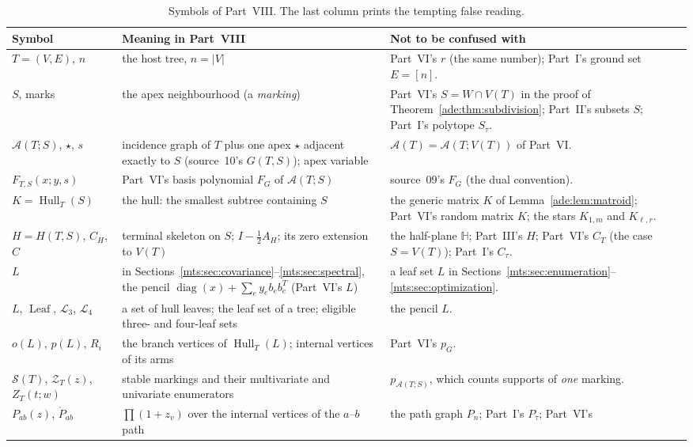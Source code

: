 \documentclass[11pt]{article}
\numberwithin{equation}{section}
\theoremstyle{definition}
\newcommand{\diag}{\operatorname{diag}}
\newcommand{\HH}{\mathbb H}
\newcommand{\calA}{\mathcal A}
\newcommand{\Hull}{\operatorname{Hull}}
\newcommand{\Leaf}{\operatorname{Leaf}}
\newcommand{\Stab}{\mathcal S}
\newcommand{\Zpoly}{\mathcal Z}
\newcommand{\pathin}[2]{\mathring P_{#1#2}}
\begin{document}
\begin{table}[tbp]
\centering\footnotesize
\caption{Symbols of Part~VIII. The last column prints the tempting false
reading.}
\label{mts:tab:notation}
\begin{tabularx}{\textwidth}{@{}>{\raggedright}p{}>{\raggedright}p{}Y@{}}
\toprule
Symbol & Meaning in Part~VIII & Not to be confused with\\
\midrule
$T=(V,E)$, $n$ & the host tree, $n=|V|$ & Part~VI's $r$ (the same number);
 Part~I's ground set $E=[n]$.\\
$S$, marks & the apex neighbourhood (a \emph{marking}) & Part~VI's
 $S=W\cap V(T)$ in the proof of Theorem~\ref{ade:thm:subdivision}; Part~II's
 subsets $S$; Part~I's polytope $S_\tau$.\\
$\calA(T;S)$, $\star$, $s$ & incidence graph of $T$ plus one apex $\star$
 adjacent exactly to $S$ (source~10's $G(T,S)$); apex variable &
 $\calA(T)=\calA(T;V(T))$ of Part~VI.\\
$F_{T,S}(x;y,s)$ & Part~VI's basis polynomial $F_G$ of $\calA(T;S)$ &
 source~09's $F_G$ (the dual convention).\\
$K=\Hull_T(S)$ & the hull: the smallest subtree containing $S$ & the
 generic matrix $K$ of Lemma~\ref{ade:lem:matroid}; Part~VI's random matrix
 $K$; the stars $K_{1,m}$ and $K_{\ell,r}$.\\
$H=H(T,S)$, $C_H$, $C$ & terminal skeleton on $S$; $I-\tfrac12A_H$; its
 zero extension to $V(T)$ & the half-plane $\HH$; Part~III's $H$; Part~VI's
 $C_T$ (the case $S=V(T)$); Part~I's $C_\tau$.\\
$L$ & in Sections~\ref{mts:sec:covariance}--\ref{mts:sec:spectral}, the
 pencil $\diag(x)+\sum_ey_eb_eb_e^T$ (Part~VI's $L$) & a leaf set $L$ in
 Sections~\ref{mts:sec:enumeration}--\ref{mts:sec:optimization}.\\
$L$, $\Leaf$, $\mathcal L_3$, $\mathcal L_4$ & a set of hull leaves; the
 leaf set of a tree; eligible three- and four-leaf sets & the pencil $L$.\\
$o(L)$, $p(L)$, $R_i$ & the branch vertices of $\Hull_T(L)$; internal
 vertices of its arms & Part~VI's $p_G$.\\
$\Stab(T)$, $\Zpoly_T(z)$, $Z_T(t;w)$ & stable markings and their
 multivariate and univariate enumerators & $p_{\calA(T;S)}$, which counts
 supports of \emph{one} marking.\\
$P_{ab}(z)$, $\pathin ab$ & $\prod(1+z_v)$ over the internal vertices of
 the $a$--$b$ path & the path graph $P_n$; Part~I's $P_\tau$; Part~VI's

\end{tabularx}
\end{table}
\end{document}
